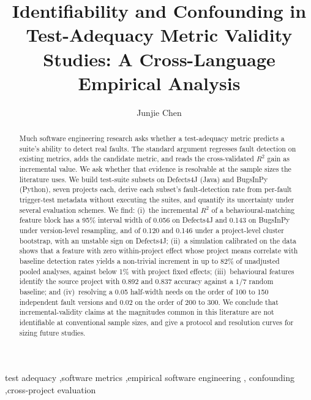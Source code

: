 \documentclass[preprint,12pt]{elsarticle}
\begin{document}
\begin{frontmatter}

\title{Identifiability and Confounding in Test-Adequacy Metric Validity Studies:
A Cross-Language Empirical Analysis}

\author[a]{Junjie Chen}

\begin{abstract}
Much software engineering research asks whether a test-adequacy
metric predicts a suite's ability to detect real faults. The standard
argument regresses fault detection on existing metrics, adds the candidate
metric, and reads the cross-validated $R^2$ gain as incremental value. We ask
whether that evidence is resolvable at the sample sizes the
literature uses. We build test-suite subsets on Defects4J (Java) and
BugsInPy (Python), seven projects each, derive each subset's fault-detection
rate from per-fault trigger-test metadata without executing the suites, and
quantify its uncertainty under several evaluation
schemes. We find: (i)~the incremental $R^2$ of a behavioural-matching feature
block has a 95\% interval width of \num{0.056} on Defects4J and \num{0.143}
on BugsInPy under version-level resampling, and of \num{0.120} and
\num{0.146} under a project-level cluster bootstrap, with an unstable sign on
Defects4J; (ii)~a simulation calibrated on the data shows that a
feature with zero within-project effect whose project means correlate with
baseline detection rates yields a non-trivial increment in up to 82\% of
unadjusted pooled analyses, against below 1\% with project fixed effects;
(iii)~behavioural features identify the source project with \num{0.892} and
\num{0.837} accuracy against a $1/7$ random baseline; and
(iv)~resolving a \num{0.05} half-width needs on the order of
\num{100} to \num{150} independent fault versions and \num{0.02} on the
order of \num{200} to \num{300}. We conclude that incremental-validity
claims at the magnitudes common in this literature are not identifiable at
conventional sample sizes, and give a protocol and resolution curves for
sizing future studies.
\end{abstract}

\begin{keyword}
test adequacy \sep software metrics \sep empirical software engineering \sep
confounding \sep cross-project evaluation
\end{keyword}

\end{frontmatter}
\end{document}
